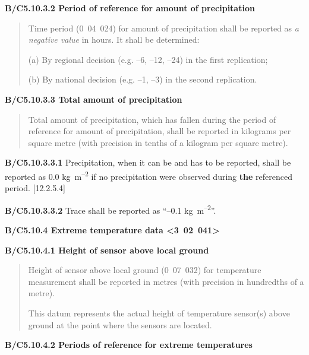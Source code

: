 \textbf{B/C5.10.3.2 Period of reference for amount of precipitation}

\begin{quote}
Time period (0~04~024) for amount of precipitation shall be reported as \emph{a negative value} in hours. It shall be determined:

(a) By regional decision (e.g. --6, --12, --24) in the first replication;

(b) By national decision (e.g. --1, --3) in the second replication.
\end{quote}

\textbf{B/C5.10.3.3 Total amount of precipitation}

\begin{quote}
Total amount of precipitation, which has fallen during the period of reference for amount of precipitation, shall be reported in kilograms per square metre (with precision in tenths of a kilogram per square metre).
\end{quote}

\textbf{B/C5.10.3.3.1} Precipitation, when it can be and has to be reported, shall be reported as 0.0 kg~m\textsuperscript{--2} if no precipitation were observed during \textbf{the} referenced period. {[}12.2.5.4{]}

\textbf{B/C5.10.3.3.2} Trace shall be reported as ``--0.1 kg~m\textsuperscript{--2}''.

\textbf{B/C5.10.4 Extreme temperature data \textless3~02~041\textgreater{}}

\textbf{B/C5.10.4.1 Height of sensor above local ground}

\begin{quote}
Height of sensor above local ground (0~07~032) for temperature measurement shall be reported in metres (with precision in hundredths of a metre).

This datum represents the actual height of temperature sensor(s) above ground at the point where the sensors are located.
\end{quote}

\textbf{B/C5.10.4.2 Periods of reference for extreme temperatures}

